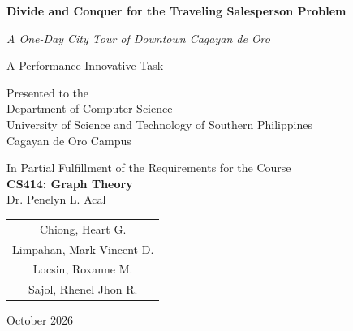 \documentclass[11pt,a4paper]{article}
\theoremstyle{plain}
\theoremstyle{definition}
\theoremstyle{remark}
\begin{document}
\begin{titlepage}
\thispagestyle{empty}
\begin{center}
  \vspace*{1.2cm}
  {\Large\bfseries Divide and Conquer for the Traveling Salesperson Problem\par}
  \vspace{0.35cm}
  {\large\itshape A One-Day City Tour of Downtown Cagayan de Oro\par}

  \vfill

  {\large A Performance Innovative Task\par}
  \vspace{0.5cm}
  Presented to the\\
  Department of Computer Science\\
  University of Science and Technology of Southern Philippines\\
  Cagayan de Oro Campus

  \vfill

  In Partial Fulfillment of the Requirements for the Course\\[0.2cm]
  \textbf{CS414: Graph Theory}\\
  Dr. Penelyn L. Acal

  \vfill

  \begin{tabular}{c}
    Chiong, Heart G.\\
    Limpahan, Mark Vincent D.\\
    Locsin, Roxanne M.\\
    Sajol, Rhenel Jhon R.
  \end{tabular}

  \vfill
  October 2026
\end{center}
\end{titlepage}

\clearpage

\begin{abstract}
We study the Divide and Conquer heuristic for the Traveling Salesperson Problem (TSP), Algorithm~2.8 of
Luna-Garcia, Candano and Caga-anan~\cite{lunagarcia2024performance}, and apply it to a one-day city tour
of \NumVertices{} locations in downtown Cagayan de Oro City that starts and ends at the \StartName. The tour is
modelled as a complete undirected weighted graph whose edge weights are road distances in kilometres.
We implement the algorithm in Python, correcting its merge step so that it always returns a valid
Hamiltonian cycle. With seed \DCSeed{} it produces the route \DCRoute{} of length \DCTotal{}~km. An exact
Held--Karp computation, used only for comparison, gives an optimum of \OptTotal{}~km, so this route is a
\emph{non-optimal} approximation that is \DCGap\% longer than the best possible tour.
\end{abstract}
\end{document}
